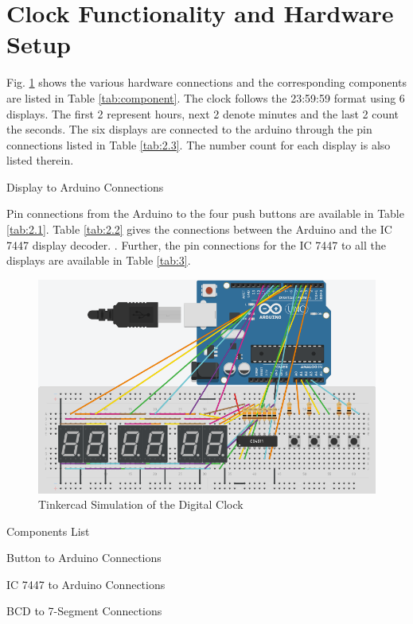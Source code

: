 \documentclass[conference]{IEEEtran}
\begin{document}
\section{Clock Functionality and Hardware Setup}
Fig. \ref{fig:tinker}  shows the various hardware connections and the corresponding components are listed in 
Table \ref{tab:component}.  The clock follows the 23:59:59 format using 6 displays.  The first 2 represent hours, next 2 denote minutes and the last 2 count the seconds.  
The six displays are connected to the arduino through the pin connections listed in Table \ref{tab:2.3}.  The number count for each display is also listed therein.
\begin{table}[!h]
\centering

\caption{Display to Arduino Connections}
\label{tab:2.3}
\end{table}
Pin connections from the Arduino to the four push buttons are available in 
Table \ref{tab:2.1}. Table \ref{tab:2.2} gives the connections between the Arduino and the IC 7447 display decoder.  .  Further, the pin connections for the IC 7447 to all the displays are available in Table \ref{tab:3}.
\begin{figure}[!ht]
\centering
\includegraphics[width=\columnwidth]{figs/Clock_Tinkercad.png}
\caption{Tinkercad Simulation of the Digital Clock}
\label{fig:tinker}
\end{figure}
\begin{table}[!h]
\centering

\caption{Components List}
\label{tab:component}
\end{table}
\begin{table}[!h]
\centering

\caption{Button to Arduino Connections}
\label{tab:2.1}
\end{table}
\begin{table}[!h]
\centering

\caption{IC 7447 to Arduino Connections}
\label{tab:2.2}
\end{table}
\begin{table}[!h]
\centering

\caption{BCD to 7-Segment Connections}
\label{tab:3}
\end{table}
\end{document}
